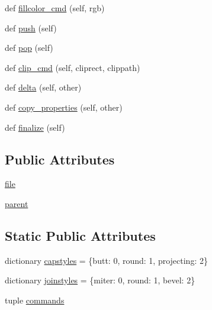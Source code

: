 \begin{DoxyCompactItemize}
\item 
def \hyperlink{classmatplotlib_1_1backends_1_1backend__pdf_1_1GraphicsContextPdf_aca0e1983cd7ab3320eec83b0505cb204}{fillcolor\+\_\+cmd} (self, rgb)
\item 
def \hyperlink{classmatplotlib_1_1backends_1_1backend__pdf_1_1GraphicsContextPdf_a308e568b103fa3c5e2fac99f377b82bf}{push} (self)
\item 
def \hyperlink{classmatplotlib_1_1backends_1_1backend__pdf_1_1GraphicsContextPdf_ad4afe4eb99670abcb87055bc5c6e30aa}{pop} (self)
\item 
def \hyperlink{classmatplotlib_1_1backends_1_1backend__pdf_1_1GraphicsContextPdf_af66fc2433a2446d108fa06f011661d52}{clip\+\_\+cmd} (self, cliprect, clippath)
\item 
def \hyperlink{classmatplotlib_1_1backends_1_1backend__pdf_1_1GraphicsContextPdf_a48166fa44a0dfdbc9b206cc1e939de1a}{delta} (self, other)
\item 
def \hyperlink{classmatplotlib_1_1backends_1_1backend__pdf_1_1GraphicsContextPdf_ade3cb6f9806be9d9fcb9dade7690f352}{copy\+\_\+properties} (self, other)
\item 
def \hyperlink{classmatplotlib_1_1backends_1_1backend__pdf_1_1GraphicsContextPdf_aa3504bc1f12770c5a3e25035640d33c1}{finalize} (self)
\end{DoxyCompactItemize}
\subsection*{Public Attributes}
\begin{DoxyCompactItemize}
\item 
\hyperlink{classmatplotlib_1_1backends_1_1backend__pdf_1_1GraphicsContextPdf_a5b5056a5bfa05653e5b803bb8387e10a}{file}
\item 
\hyperlink{classmatplotlib_1_1backends_1_1backend__pdf_1_1GraphicsContextPdf_a38fd36210838c8667baf32b215abd8e7}{parent}
\end{DoxyCompactItemize}
\subsection*{Static Public Attributes}
\begin{DoxyCompactItemize}
\item 
dictionary \hyperlink{classmatplotlib_1_1backends_1_1backend__pdf_1_1GraphicsContextPdf_aee019e8380c9f3c3d19b4807b0e024fb}{capstyles} = \{\textquotesingle{}butt\textquotesingle{}\+: 0, \textquotesingle{}round\textquotesingle{}\+: 1, \textquotesingle{}projecting\textquotesingle{}\+: 2\}
\item 
dictionary \hyperlink{classmatplotlib_1_1backends_1_1backend__pdf_1_1GraphicsContextPdf_a3d27a9d96850286d11883be2d9afe447}{joinstyles} = \{\textquotesingle{}miter\textquotesingle{}\+: 0, \textquotesingle{}round\textquotesingle{}\+: 1, \textquotesingle{}bevel\textquotesingle{}\+: 2\}
\item 
tuple \hyperlink{classmatplotlib_1_1backends_1_1backend__pdf_1_1GraphicsContextPdf_a5994b3ceebb8ca86feb327cf79094d8c}{commands}
\end{DoxyCompactItemize}


